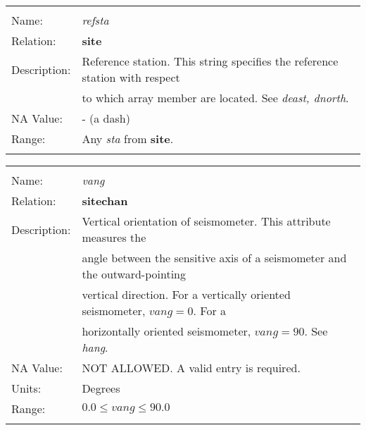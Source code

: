 \begin{tabular*}{6.5 in}{ll} \hline
\\
Name: & {\it refsta  } \\
Relation: & {\bf site} \\
Description: & Reference station. This string specifies the reference station with respect \\
& to which array member are located. See {\it deast, dnorth}. \\
NA Value: & - (a dash) \\
Range: & Any {\it sta} from {\bf site}. \\
&\\
\end{tabular*}
\begin{tabular*}{6.5 in}{ll} \hline
\\
Name: & {\it vang } \\
Relation: & {\bf sitechan} \\
Description: & Vertical orientation of seismometer. This attribute measures the \\
& angle between the sensitive axis of a seismometer and the outward-pointing \\
& vertical direction. For a vertically oriented seismometer, $vang =0$. For a \\
& horizontally oriented seismometer, $vang=90$. See {\it hang}. \\
NA Value: & NOT ALLOWED. A valid entry is required. \\
Units: & Degrees \\
Range: & $0.0 \leq vang \leq 90.0$ \\
&\\
\end{tabular*}
